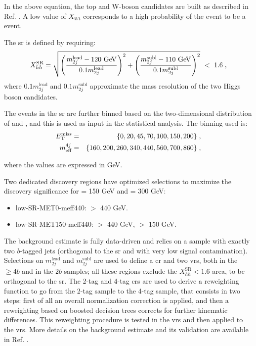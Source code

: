 In the above equation, the top and W-boson candidates are built as described in Ref. \cite{Aaboud:2018htj}. 
A low value of $X_{Wt}$ corresponds to a high probability of the event to be a \ttbar event. 

The \gls{sr} is defined by requiring: 
\begin{equation}
X_{hh}^\textrm{SR} = \sqrt{ \left( \frac{m_{2j}^\textrm{lead} - 120\ \text{Ge\kern -0.1em V}}{0.1 m_{2j}^\textrm{lead}} \right)^2 + \left( \frac{m_{2j}^\textrm{subl} - 110\ \text{Ge\kern -0.1em V}}{0.1 m_{2j}^\textrm{subl}} \right)^2} \ <\ 1.6 \; , \nonumber
\end{equation}
\noindent where $0.1  m_{2j}^\textrm{lead}$ and $0.1 m_{2j}^\textrm{subl}$ approximate the mass resolution of the two Higgs 
boson candidates. 

The events in the \gls{sr} are further binned based on the two-dimensional distribution of \met and \meff, 
and this is used as input in the statistical analysis. The binning used is:
\begin{eqnarray*} 
E_{\rm T}^{\mathrm{miss}} &=& \{0, 20, 45, 70, 100, 150, 200\} \;, \\
m_{\mathrm{eff}}^{4j} &=&\{160, 200, 260, 340, 440, 560, 700, 860\} \;, \nonumber
\end{eqnarray*}

\noindent where the values are expressed in GeV.

Two dedicated discovery regions have optimized selections to maximize the discovery significance for \mhino = 150 GeV and \mhino = 300 GeV:
\begin{itemize}
\item low-SR-MET0-meff440: \meffb $>$ 440 GeV.
\item low-SR-MET150-meff440: \meffb $>$ 440 GeV, \met $>$ 150 GeV.
\end{itemize}

The background estimate is fully data-driven and relies on a sample with exactly two $b$-tagged jets (orthogonal to the \gls{sr} and 
with very low signal contamination). 
Selections on $m_{2j}^\textrm{lead}$ and $m_{2j}^\textrm{subl}$ are used to define a \gls{cr} and two \glspl{vr}, both in the $\geq4b$ and in the $2b$ samples; all these regions exclude the $X_{hh}^\textrm{SR}<1.6$ area, to be orthogonal to the \gls{sr}.
The 2-tag and 4-tag \glspl{cr} are used to derive a reweighting function to go from the 2-tag sample to the 4-tag sample, that consists in two steps:
first of all an overall normalization correction is applied, and then 
a reweighting based on boosted decision trees corrects for further kinematic differences. 
This reweighting procedure is tested in the \glspl{vr} and then applied to the \glspl{vr}.
More details on the background estimate and its validation are available in Ref. \cite{Aaboud:2018htj}.

